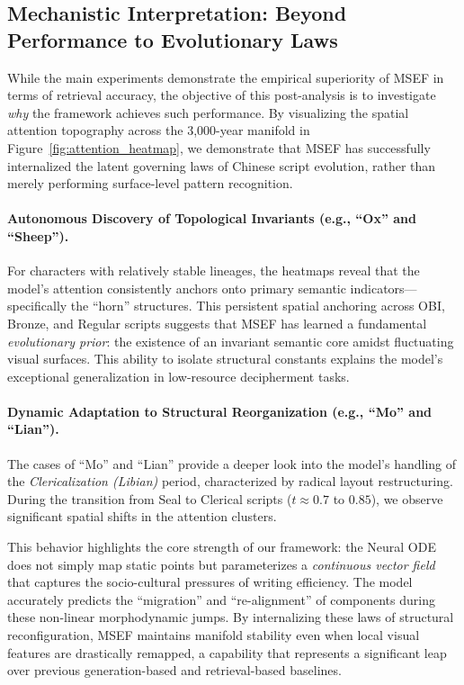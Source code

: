 \documentclass{article}
\begin{document}
\subsection{Mechanistic Interpretation: Beyond Performance to Evolutionary Laws}
\label{sec:post_analysis_mechanisms}

While the main experiments demonstrate the empirical superiority of MSEF in terms of retrieval accuracy, the objective of this post-analysis is to investigate \textit{why} the framework achieves such performance. By visualizing the spatial attention topography across the 3,000-year manifold in Figure~\ref{fig:attention_heatmap}, we demonstrate that MSEF has successfully internalized the latent governing laws of Chinese script evolution, rather than merely performing surface-level pattern recognition.

\paragraph{Autonomous Discovery of Topological Invariants (e.g., ``Ox'' and ``Sheep'').} 
For characters with relatively stable lineages, the heatmaps reveal that the model’s attention consistently anchors onto primary semantic indicators—specifically the ``horn'' structures. This persistent spatial anchoring across OBI, Bronze, and Regular scripts suggests that MSEF has learned a fundamental \textit{evolutionary prior}: the existence of an invariant semantic core amidst fluctuating visual surfaces. This ability to isolate structural constants explains the model's exceptional generalization in low-resource decipherment tasks.

\paragraph{Dynamic Adaptation to Structural Reorganization (e.g., ``Mo'' and ``Lian'').} 
The cases of ``Mo'' and ``Lian'' provide a deeper look into the model's handling of the \textit{Clericalization (Libian)} period, characterized by radical layout restructuring. During the transition from Seal to Clerical scripts ($t \approx 0.7$ to $0.85$), we observe significant spatial shifts in the attention clusters. 

This behavior highlights the core strength of our framework: the Neural ODE does not simply map static points but parameterizes a \textit{continuous vector field} that captures the socio-cultural pressures of writing efficiency. The model accurately predicts the ``migration'' and ``re-alignment'' of components during these non-linear morphodynamic jumps. By internalizing these laws of structural reconfiguration, MSEF maintains manifold stability even when local visual features are drastically remapped, a capability that represents a significant leap over previous generation-based and retrieval-based baselines.
\end{document}
